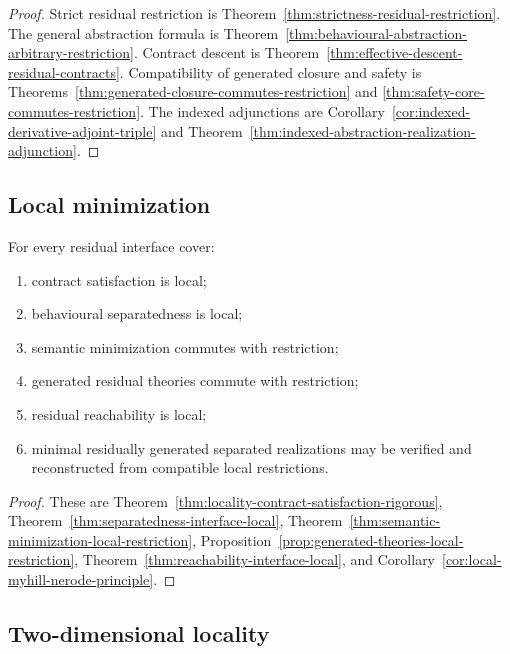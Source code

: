 \begin{proof}
Strict residual restriction is
Theorem~\ref{thm:strictness-residual-restriction}.
The general abstraction formula is
Theorem~\ref{thm:behavioural-abstraction-arbitrary-restriction}.
Contract descent is
Theorem~\ref{thm:effective-descent-residual-contracts}.
Compatibility of generated closure and safety is
Theorems~\ref{thm:generated-closure-commutes-restriction} and
\ref{thm:safety-core-commutes-restriction}.
The indexed adjunctions are
Corollary~\ref{cor:indexed-derivative-adjoint-triple} and
Theorem~\ref{thm:indexed-abstraction-realization-adjunction}.
\end{proof}

\subsection{Local minimization}
\label{subsec:local-minimization-summary}

\begin{theorem}
\label{thm:local-minimization-summary}
For every residual interface cover:
\begin{enumerate}
    \item contract satisfaction is local;
    \item behavioural separatedness is local;
    \item semantic minimization commutes with restriction;
    \item generated residual theories commute with restriction;
    \item residual reachability is local;
    \item minimal residually generated separated realizations may be verified
    and reconstructed from compatible local restrictions.
\end{enumerate}
\end{theorem}

\begin{proof}
These are
Theorem~\ref{thm:locality-contract-satisfaction-rigorous},
Theorem~\ref{thm:separatedness-interface-local},
Theorem~\ref{thm:semantic-minimization-local-restriction},
Proposition~\ref{prop:generated-theories-local-restriction},
Theorem~\ref{thm:reachability-interface-local}, and
Corollary~\ref{cor:local-myhill-nerode-principle}.
\end{proof}

\subsection{Two-dimensional locality}
\label{subsec:two-dimensional-locality-summary}

